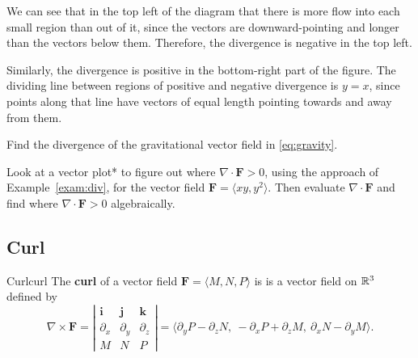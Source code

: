 \documentclass{watsonbook}
\begin{document}
\begin{solution}
  We can see that in the top left of the diagram that there is more
  flow into each small region than out of it, since the vectors are
  downward-pointing and longer than the vectors below them. Therefore,
  the divergence is negative in the top left.

  Similarly, the divergence is positive in the bottom-right part of
  the figure. The dividing line between regions of positive and
  negative divergence is $y = x$, since points along that line have
  vectors of equal length pointing towards and away from them.
\end{solution}

\begin{exercise}{}{}
  Find the divergence of the gravitational vector field in
  \eqref{eq:gravity}. 
\end{exercise}

\begin{exercise}{}{}
  Look at a vector plot* to figure out where
  $\nabla \cdot \mathbf{F} > 0$, using the approach of
  Example~\ref{exam:div}, for the vector field
  $\mathbf{F} = \langle xy, y^2 \rangle$. Then evaluate
  $\nabla \cdot \mathbf{F}$ and find where
  $\nabla \cdot \mathbf{F} > 0$ algebraically.
\end{exercise}

\subsection{Curl}


\begin{defn}{Curl}{curl}
  The \textbf{curl} of a vector field $\mathbf{F} = \langle M, N, P \rangle$ is
  is a vector field on $\mathbb{R}^3$ defined by \renewcommand\arraystretch{1.4}
  \[
    \nabla \times \mathbf{F} =
    \left|
      \begin{array}{ccc}
        \mathbf{i} & \mathbf{j} & \mathbf{k} \\
        \partial_x  & \partial_y & \partial_z \\
              M         &       N       &      P
      \end{array} 
    \right| = \big\langle \partial_y P - \partial_z N, \:
    -\partial_x P  + \partial_z M, \:
    \partial_x N - \partial_y M \big\rangle. 
  \]
\end{defn}
\end{document}
